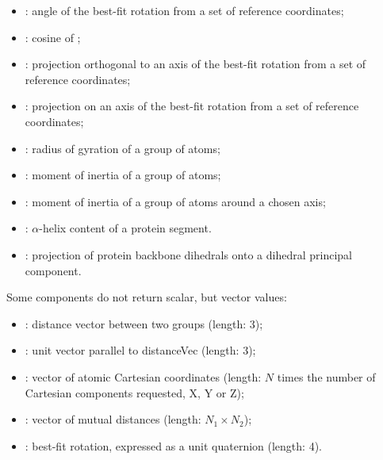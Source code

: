 \begin{itemize}
\item {}: angle of the best-fit rotation from
  a set of reference coordinates;
\item {}: cosine of ;
\item {}: projection orthogonal to an axis of the best-fit rotation
  from a set of reference coordinates;
\item {}: projection on an axis of the best-fit rotation
  from a set of reference coordinates;
\item {}: radius of gyration of a group of atoms;
\item {}: moment of inertia of a group of atoms;
\item {}: moment of inertia of a group of atoms around a chosen axis;
\item {}: $\alpha$-helix content of a protein segment.
\item {}: projection of protein backbone dihedrals onto a dihedral principal component.
\end{itemize}

Some components do not return scalar, but vector values:
\begin{itemize}
\item {}: distance vector between two groups (length: 3);
\item {}: unit vector parallel to distanceVec (length: 3);
\item {}: vector of atomic Cartesian coordinates (length: $N$ times the number of Cartesian components requested, X, Y or Z);
\item {}: vector of mutual distances (length: $N_{\mathrm{1}}\times{}N_{\mathrm{2}}$);
\item {}: best-fit rotation, expressed as a unit quaternion (length: 4).
\end{itemize}

